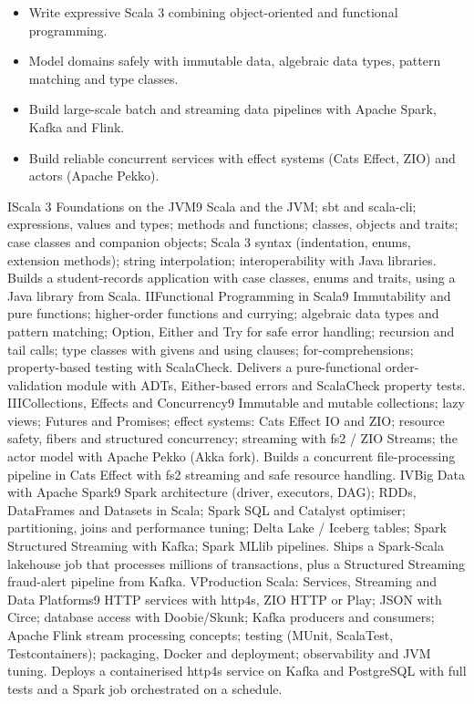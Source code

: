 \begin{itemize}
\item Write expressive Scala 3 combining object-oriented and functional programming.
\item Model domains safely with immutable data, algebraic data types, pattern matching and type classes.
\item Build large-scale batch and streaming data pipelines with Apache Spark, Kafka and Flink.
\item Build reliable concurrent services with effect systems (Cats Effect, ZIO) and actors (Apache Pekko).
\end{itemize}

\unit{I}{Scala 3 Foundations on the JVM}{9}{%
Scala and the JVM; sbt and scala-cli; expressions, values and types; methods and functions; classes, objects and traits;
case classes and companion objects; Scala 3 syntax (indentation, enums, extension methods); string interpolation;
interoperability with Java libraries.}
{Builds a student-records application with case classes, enums and traits, using a Java library from Scala.}
\unit{II}{Functional Programming in Scala}{9}{%
Immutability and pure functions; higher-order functions and currying; algebraic data types and pattern matching;
Option, Either and Try for safe error handling; recursion and tail calls; type classes with givens and using clauses;
for-comprehensions; property-based testing with ScalaCheck.}
{Delivers a pure-functional order-validation module with ADTs, Either-based errors and ScalaCheck property tests.}
\unit{III}{Collections, Effects and Concurrency}{9}{%
Immutable and mutable collections; lazy views; Futures and Promises; effect systems: Cats Effect IO and ZIO;
resource safety, fibers and structured concurrency; streaming with fs2 / ZIO Streams; the actor model with Apache Pekko (Akka fork).}
{Builds a concurrent file-processing pipeline in Cats Effect with fs2 streaming and safe resource handling.}
\unit{IV}{Big Data with Apache Spark}{9}{%
Spark architecture (driver, executors, DAG); RDDs, DataFrames and Datasets in Scala; Spark SQL and Catalyst optimiser;
partitioning, joins and performance tuning; Delta Lake / Iceberg tables; Spark Structured Streaming with Kafka;
Spark MLlib pipelines.}
{Ships a Spark-Scala lakehouse job that processes millions of transactions, plus a Structured Streaming fraud-alert pipeline from Kafka.}
\unit{V}{Production Scala: Services, Streaming and Data Platforms}{9}{%
HTTP services with http4s, ZIO HTTP or Play; JSON with Circe; database access with Doobie/Skunk; Kafka producers and consumers;
Apache Flink stream processing concepts; testing (MUnit, ScalaTest, Testcontainers); packaging, Docker and deployment;
observability and JVM tuning.}
{Deploys a containerised http4s service on Kafka and PostgreSQL with full tests and a Spark job orchestrated on a schedule.}

